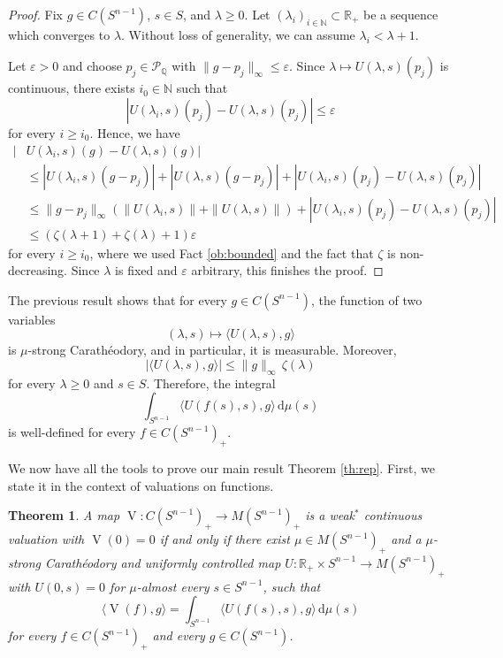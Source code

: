 \documentclass[11pt, a4paper]{amsart}
\newtheorem{theorem}[proposition]{Theorem}
\renewcommand{\d}{\,\mathrm{d}}
\newcommand{\cm}{\zeta}
\newcommand{\rp}{\mathbb R_{\scriptscriptstyle +}}
\newcommand{\sn}{{S^{n-1}}}
\renewcommand{\d}{\,\mathrm{d}}
\newcommand{\oV}{\operatorname{V}}
\newcommand{\measn}{M(\sn )_{\scriptscriptstyle +}}
\newcommand{\cfn}{C(\sn )_{\scriptscriptstyle +}}
\newcommand{\poly}{\mathcal P_{\mathbb Q}}
\newcommand{\somename}{strong Cara\-th\'eo\-dory and uniformly controlled }
\begin{document}
\begin{proof}
Fix $g\in C(\sn )$,  $s\in S$, and $\lambda\ge 0$. Let $(\lambda_i)_{i\in \mathbb N} \subset \rp$ be a sequence which converges to $\lambda$. Without loss of generality, we can assume $\lambda_i <\lambda+1$.

Let $\varepsilon > 0$ and choose $p_j\in\poly$ with $\|g-p_j\|_{\scriptscriptstyle \infty}\leq \varepsilon$. Since $\lambda\mapsto U(\lambda, s)(p_j)$ is continuous, there exists $i_0\in \mathbb N$ such that  
$$\left|  U(\lambda_i, s)(p_j) -   U(\lambda, s)(p_j) \right|\leq \varepsilon$$
for every $i\geq i_0$. Hence, we have
\begin{align*}
   \vert  &U(\lambda_i, s)(g) -  U(\lambda, s)(g)\vert \\
&\leq  | U(\lambda_i, s)(g-p_j) | +   |U(\lambda, s)(g-p_j)| + |U(\lambda_i, s)(p_j) - U(\lambda, s)(p_j)  | \\
 &\leq \|g-p_j\|_{\scriptscriptstyle \infty}(\|U(\lambda_i, s)\|+\| U(\lambda, s)\| ) +|  U(\lambda_i, s)(p_j) - U(\lambda, s)(p_j) | \\
 &\leq  (\cm(\lambda+1)+\cm(\lambda)+1)\varepsilon
\end{align*}
for every $i\geq i_0$, where we used Fact \ref{ob:bounded} and the fact that $\zeta$ is non-decreasing. Since $\lambda$ is fixed and $\varepsilon$ arbitrary, this finishes the proof.
\end{proof}

The previous result shows that for every $g\in C(S^{n-1})$, the function of two variables $$(\lambda, s)\mapsto \langle U(\lambda, s),g\rangle$$ is $\mu$-strong Carath\'eodory, and in particular, it is measurable. Moreover, 
$$|\langle U(\lambda, s),g\rangle|\leq  \|g\|_{\scriptscriptstyle \infty}\, \cm(\lambda)$$ 
for every $\lambda\ge 0$ and $s\in S$. Therefore, the integral $$\int_{\sn } \langle U(f(s),s),g \rangle \d\mu(s)$$ is well-defined for every $f\in \cfn$.
  
We now have all the tools to prove our main result Theorem \ref{th:rep}. First, we state it in the context of  valuations on functions.

\begin{theorem}\label{th:representation}
A map $\oV\colon  \cfn\to \measn$ is a weak$^*$\! continuous valuation with $\oV(0)=0$ if and only if there exist $\mu\in \measn$ and a $\mu$-\somename map $U\colon \rp \times \sn  \to \measn$ with $U(0,s)=0$ for $\mu$-almost every $s\in \sn$, such that
\begin{equation}\label{eq_equality}
\langle \oV(f),g\rangle = \int_{\sn } \langle U(f(s), s),g\rangle \d\mu(s)
\end{equation}
for every $f\in\cfn$ and every $g\in C(\sn)$. 
\end{theorem}
\end{document}
